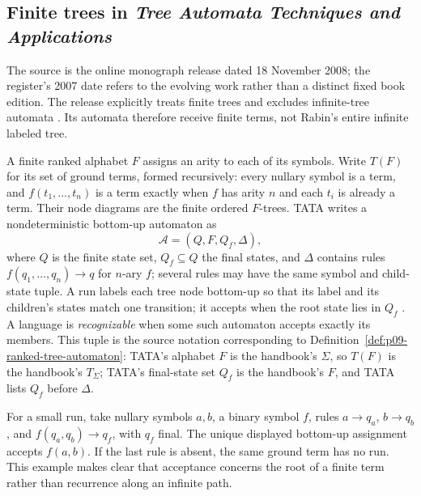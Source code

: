 
\subsection{Finite trees in \emph{Tree Automata Techniques and Applications}}
\label{sec:p09-presentation-n-c-015}

The source is the online monograph release dated 18 November 2008; the register's
2007 date refers to the evolving work rather than a distinct fixed book
edition.  The release explicitly treats finite trees and excludes infinite-tree
automata \cite[pp.~11--13]{ComonEtAl2007}.  Its automata therefore receive
finite terms, not Rabin's entire infinite labeled tree.

A finite ranked alphabet \(F\) assigns an arity to each of its symbols.  Write
\(T(F)\) for its set of ground terms, formed recursively: every nullary symbol
is a term, and
\(f(t_1,\ldots,t_n)\) is a term exactly when \(f\) has arity \(n\) and each
\(t_i\) is already a term.  Their node diagrams are the finite ordered
\(F\)-trees.  TATA writes a nondeterministic bottom-up automaton as
\[
 \mathcal A=(Q,F,Q_f,\Delta),
\]
where \(Q\) is the finite state set, \(Q_f\subseteq Q\) the final states, and
\(\Delta\) contains rules
\(f(q_1,\ldots,q_n)\to q\) for \(n\)-ary \(f\); several rules may have
the same symbol and child-state tuple.  A run labels each tree node
bottom-up so that its label and its children's states match one transition; it
accepts when the root state lies in \(Q_f\)
\cite[\S1.1]{ComonEtAl2007}.  A language is \emph{recognizable} when some
such automaton accepts exactly its members.  This tuple is the source notation
corresponding to Definition~\ref{def:p09-ranked-tree-automaton}: TATA's
alphabet \(F\) is the handbook's \(\Sigma\), so \(T(F)\) is the handbook's
\(T_\Sigma\); TATA's final-state set \(Q_f\) is the handbook's \(F\), and TATA
lists \(Q_f\) before \(\Delta\).

For a small run, take nullary symbols \(a,b\), a binary symbol \(f\), rules
\(a\to q_a\), \(b\to q_b\), and
\(f(q_a,q_b)\to q_f\), with \(q_f\) final.  The unique displayed bottom-up
assignment accepts \(f(a,b)\).  If the last rule is absent, the same ground
term has no run.  This example makes clear that acceptance concerns the root of
a finite term rather than recurrence along an infinite path.

